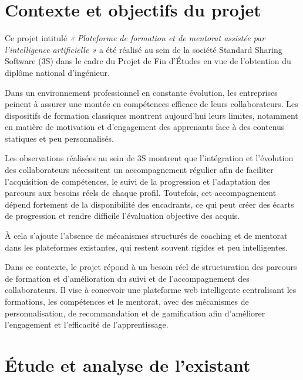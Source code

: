 




\section{Contexte et objectifs du projet}

Ce projet intitulé \textit{« Plateforme de formation et de mentorat assistée par l'intelligence artificielle »} a été réalisé au sein de la société Standard Sharing Software (3S) dans le cadre du Projet de Fin d'Études en vue de l'obtention du diplôme national d'ingénieur.

Dans un environnement professionnel en constante évolution, les entreprises peinent à assurer une montée en compétences efficace de leurs collaborateurs. Les dispositifs de formation classiques montrent aujourd'hui leurs limites, notamment en matière de motivation et d'engagement des apprenants face à des contenus statiques et peu personnalisés.

Les observations réalisées au sein de 3S montrent que l'intégration et l'évolution des collaborateurs nécessitent un accompagnement régulier afin de faciliter l'acquisition de compétences, le suivi de la progression et l'adaptation des parcours aux besoins réels de chaque profil. Toutefois, cet accompagnement dépend fortement de la disponibilité des encadrants, ce qui peut créer des écarts de progression et rendre difficile l'évaluation objective des acquis.

À cela s'ajoute l'absence de mécanismes structurés de coaching et de mentorat dans les plateformes existantes, qui restent souvent rigides et peu intelligentes.

Dans ce contexte, le projet répond à un besoin réel de structuration des parcours de formation et d'amélioration du suivi et de l'accompagnement des collaborateurs. Il vise à concevoir une plateforme web intelligente centralisant les formations, les compétences et le mentorat, avec des mécanismes de personnalisation, de recommandation et de gamification afin d'améliorer l'engagement et l'efficacité de l'apprentissage.

\section{Étude et analyse de l'existant}


